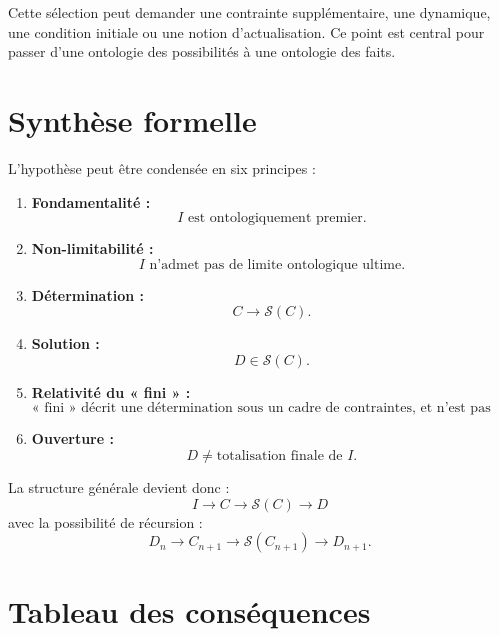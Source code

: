 \documentclass[11pt,a4paper]{article}
\begin{document}
Cette sélection peut demander une contrainte supplémentaire, une dynamique,
une condition initiale ou une notion d'actualisation. Ce point est central
pour passer d'une ontologie des possibilités à une ontologie des faits.

\section{Synthèse formelle}

L'hypothèse peut être condensée en six principes :

\begin{enumerate}
\item \textbf{Fondamentalité :}
\[
I\text{ est ontologiquement premier.}
\]

\item \textbf{Non-limitabilité :}
\[
I\text{ n'admet pas de limite ontologique ultime.}
\]

\item \textbf{Détermination :}
\[
C\to\mathcal S(C).
\]

\item \textbf{Solution :}
\[
D\in\mathcal S(C).
\]

\item \textbf{Relativité du « fini » :}
\[
\text{« fini » décrit une détermination sous un cadre de contraintes,
et n'est pas posé comme primitive ontologique.}
\]

\item \textbf{Ouverture :}
\[
D\neq\text{totalisation finale de }I.
\]
\end{enumerate}

La structure générale devient donc :
\[
\boxed{
I
\longrightarrow
C
\longrightarrow
\mathcal S(C)
\longrightarrow
D
}
\]
avec la possibilité de récursion :
\[
\boxed{
D_n\longrightarrow C_{n+1}\longrightarrow
\mathcal S(C_{n+1})\longrightarrow D_{n+1}.
}
\]

\section{Tableau des conséquences}
\end{document}
